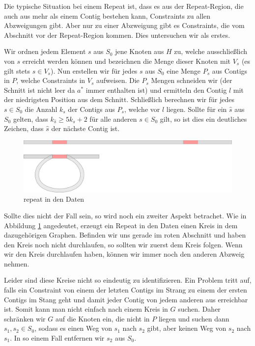 Die typische Situation bei einem Repeat ist, dass es aus der Repeat-Region, die auch aus mehr als einem Contig bestehen kann, Constraints zu allen Abzweigungen gibt. Aber nur zu einer Abzweigung gibt es Constraints, die vom Abschnitt vor der Repeat-Region kommen. Dies untersuchen wir als erstes.

Wir ordnen jedem Element $s$ aus $S_0$ jene Knoten aus $H$ zu, welche ausschließlich von $s$ erreicht werden können und bezeichnen die Menge dieser Knoten mit $V_s$ (es gilt stets $s \in V_s$). Nun erstellen wir für jedes $s$ aus $S_0$ eine Menge $P_s$ aus Contigs in $P$, welche Constraints in $V_s$ aufweisen. Die $P_s$ Mengen schneiden wir (der Schnitt ist nicht leer da $a^*$ immer enthalten ist) und ermitteln den Contig $l$ mit der niedrigsten Position aus dem Schnitt. Schließlich berechnen wir für jedes $s \in S_0$ die Anzahl $k_s$ der Contigs aus $P_s$, welche vor $l$ liegen. Sollte für ein $\hat{s}$ aus $S_0$ gelten, dass $k_{\hat{s}} \geq 5k_s+2$ für alle anderen $s \in S_0$ gilt, so ist dies ein deutliches Zeichen, dass  $\hat{s}$ der nächste Contig ist. 


\begin{figure}
	\begin{center}
		\includegraphics[width=1\textwidth]{bilder/repeat_kreis}
	\end{center}
	\label{repeat_kreis}
	\caption{repeat in den Daten}
\end{figure}
Sollte dies nicht der Fall sein, so wird noch ein zweiter Aspekt betrachet. Wie in Abbildung \ref{repeat_kreis} angedeutet, erzeugt ein Repeat in den Daten einen Kreis in dem dazugehörigen Graphen. Befinden wir uns gerade im roten Abschnitt und haben den Kreis noch nicht durchlaufen, so sollten wir zuerst dem Kreis folgen. Wenn wir den Kreis durchlaufen haben, können wir immer noch den anderen Abzweig nehmen.

Leider sind diese Kreise nicht so eindeutig zu identifizieren. 
Ein Problem tritt auf, falls ein Constraint von einem der letzten Contigs im Strang zu einem der ersten Contigs im Stang geht und damit jeder Contig von jedem anderen aus erreichbar ist. Somit kann man nicht einfach nach einem Kreis in $G$ suchen. Daher schränken wir $G$ auf die Knoten ein, die nicht in $P$ liegen und suchen dann $s_1,s_2 \in S_0$, sodass es einen Weg von $s_1$ nach $s_2$ gibt, aber keinen Weg von $s_2$ nach $s_1$. In so einem Fall entfernen wir $s_2$ aus $S_0$.

